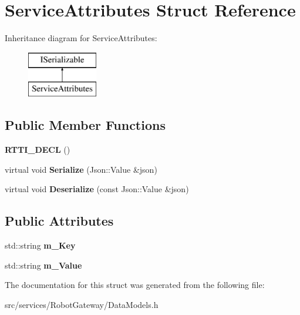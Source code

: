 \hypertarget{struct_service_attributes}{}\section{Service\+Attributes Struct Reference}
\label{struct_service_attributes}
Inheritance diagram for Service\+Attributes\+:\begin{figure}[H]
\begin{center}
\leavevmode
\includegraphics[height=2.000000cm]{struct_service_attributes}
\end{center}
\end{figure}
\subsection*{Public Member Functions}
\begin{DoxyCompactItemize}
\item 
\mbox{\label{struct_service_attributes_a13edc7285a4441e78187553ab5b0431a}} 
{\bfseries R\+T\+T\+I\+\_\+\+D\+E\+CL} ()
\item 
\mbox{\label{struct_service_attributes_a70c34c2420c5f641a4fde03d55ff4f65}} 
virtual void {\bfseries Serialize} (Json\+::\+Value \&json)
\item 
\mbox{\label{struct_service_attributes_a999da4bbf7cc4d03fc7c14ebee2fb333}} 
virtual void {\bfseries Deserialize} (const Json\+::\+Value \&json)
\end{DoxyCompactItemize}
\subsection*{Public Attributes}
\begin{DoxyCompactItemize}
\item 
\mbox{\label{struct_service_attributes_a952beeaee62cbe11f95322e4ccca90d6}} 
std\+::string {\bfseries m\+\_\+\+Key}
\item 
\mbox{\label{struct_service_attributes_a225742ce24c633b5830faf64f61f24a9}} 
std\+::string {\bfseries m\+\_\+\+Value}
\end{DoxyCompactItemize}


The documentation for this struct was generated from the following file\+:\begin{DoxyCompactItemize}
\item 
src/services/\+Robot\+Gateway/Data\+Models.\+h\end{DoxyCompactItemize}
